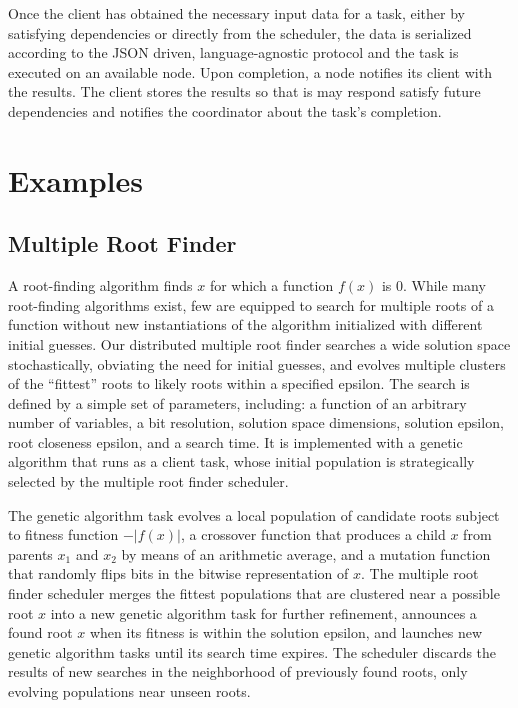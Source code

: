 \documentclass [11pt, twocolumn] {article}
\begin{document}
Once the client has obtained the necessary input data for a task, either by satisfying dependencies or directly from the scheduler, the data is serialized according to the JSON driven, language-agnostic protocol and the task is executed on an available node. Upon completion, a node notifies its client with the results. The client stores the results so that is may respond satisfy future dependencies and notifies the coordinator about the task's completion.

\section {Examples}

\subsection {Multiple Root Finder} 

\newcommand{\abs}[1]{\lvert{#1}\rvert}

A root-finding algorithm finds $x$ for which a function $f(x)$ is 0. While many root-finding algorithms exist, few are equipped to search for multiple roots of a function without new instantiations of the algorithm initialized with different initial guesses. Our distributed multiple root finder searches a wide solution space stochastically, obviating the need for initial guesses, and evolves multiple clusters of the ``fittest'' roots to likely roots within a specified epsilon. The search is defined by a simple set of parameters, including: a function of an arbitrary number of variables, a bit resolution, solution space dimensions, solution epsilon, root closeness epsilon, and a search time. It is implemented with a genetic algorithm that runs as a client task, whose initial population is strategically selected by the multiple root finder scheduler.

The genetic algorithm task evolves a local population of candidate roots subject to fitness function $-\abs{f(x)}$, a crossover function that produces a child $x$ from parents $x_1$ and $x_2$ by means of an arithmetic average, and a mutation function that randomly flips bits in the bitwise representation of $x$. The multiple root finder scheduler merges the fittest populations that are clustered near a possible root $x$ into a new genetic algorithm task for further refinement, announces a found root $x$ when its fitness is within the solution epsilon, and launches new genetic algorithm tasks until its search time expires. The scheduler discards the results of new searches in the neighborhood of previously found roots, only evolving populations near unseen roots.
\end{document}
